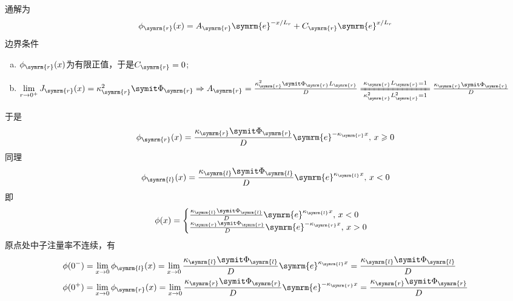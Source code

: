\begin{exercise}
\begin{solution}
\begin{enumerate}[(1)]
\begin{equation*}
            \end{equation*}
            通解为
            \begin{equation*}
                \phi_{\symrm{r}}(x) = A_{\symrm{r}} \symrm{e}^{-x/L_r} + C_{\symrm{r}} \symrm{e}^{x/L_r}
            \end{equation*}
            边界条件
            \begin{enumerate}[(a)]
                \item $\phi_{\symrm{r}}(x)$为有限正值，于是$C_{\symrm{r}} = 0$;
                \item $\lim\limits_{r\to 0^{+}} J_{\symrm{r}}(x) = \kappa_{\symrm{r}}^2 \vPhi_{\symrm{r}} \Rightarrow A_{\symrm{r}} = \frac{\kappa_{\symrm{r}}^2 \vPhi_{\symrm{r}} L_{\symrm{r}}}{D} \xlongequal[\kappa_{\symrm{r}}^2 L_{\symrm{r}}^2 = 1]{\kappa_{\symrm{r}} L_{\symrm{r}} = 1} \frac{\kappa_{\symrm{r}} \vPhi_{\symrm{r}}}{D}$
            \end{enumerate}
            于是
            \begin{equation*}
                \phi_{\symrm{r}}(x) = \frac{\kappa_{\symrm{r}} \vPhi_{\symrm{r}}}{D} \symrm{e}^{-\kappa_{\symrm{r}}x},\,x\geqslant 0
            \end{equation*}
            同理
            \begin{equation*}
                \phi_{\symrm{l}}(x) = \frac{\kappa_{\symrm{l}} \vPhi_{\symrm{l}}}{D} \symrm{e}^{\kappa_{\symrm{l}}x},\,x < 0
            \end{equation*}
            即
            \begin{equation*}
                \phi(x) = \begin{cases}
                    \frac{\kappa_{\symrm{l}} \vPhi_{\symrm{l}}}{D} \symrm{e}^{\kappa_{\symrm{l}}x},\,x < 0 \\
                    \frac{\kappa_{\symrm{r}} \vPhi_{\symrm{r}}}{D} \symrm{e}^{-\kappa_{\symrm{r}}x},\,x > 0
                \end{cases}
            \end{equation*}
            原点处中子注量率不连续，有
            \begin{align*}
                &\phi(0^{-}) = \lim_{x \to 0} \phi_{\symrm{l}}(x) = \lim_{x \to 0} \frac{\kappa_{\symrm{l}} \vPhi_{\symrm{l}}}{D} \symrm{e}^{\kappa_{\symrm{l}}x} = \frac{\kappa_{\symrm{l}} \vPhi_{\symrm{l}}}{D} \\
                &\phi(0^{+}) = \lim_{x \to 0} \phi_{\symrm{r}}(x) = \lim_{x \to 0} \frac{\kappa_{\symrm{r}} \vPhi_{\symrm{r}}}{D} \symrm{e}^{-\kappa_{\symrm{r}}x} = \frac{\kappa_{\symrm{r}} \vPhi_{\symrm{r}}}{D}

\end{align*}
\end{enumerate}
\end{solution}
\end{exercise}

